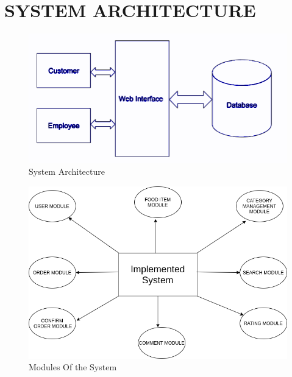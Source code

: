 \documentclass[12pt,a4paper]{report}
\begin{document}
\section{SYSTEM ARCHITECTURE}
\begin{figure}[h!]
\centering
\includegraphics[scale=0.4]{arc}
\caption{System Architecture}
\label{Architecture}
\end{figure}

\begin{figure}[h!]
  \centering
  \includegraphics[scale=0.6]{mod}
  \caption{Modules Of the System}
  \label{Architecture}
  \end{figure}
\end{document}
